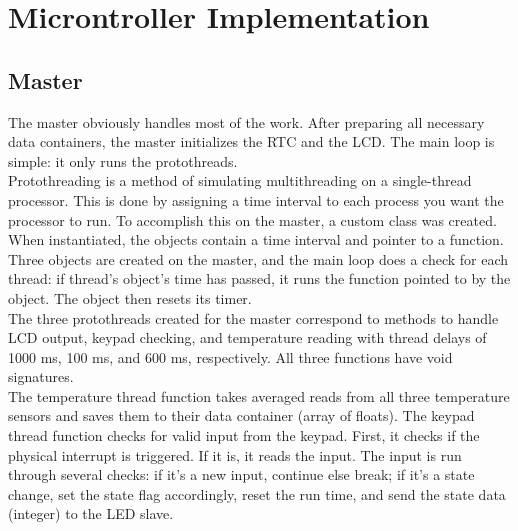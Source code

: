 \documentclass{article}
\begin{document}
\newpage

\section{Microntroller Implementation}
\label{sec:MCUImplementation}


\subsection{Master}
\label{sec:Master}

The master obviously handles most of the work. After preparing all necessary data containers, the master initializes the RTC and the LCD. The main loop is simple: it only runs the protothreads.\\

\noindent Protothreading is a method of simulating multithreading on a single-thread processor. This is done by assigning a time interval to each process you want the processor to run. To accomplish this on the master, a custom class was created. When instantiated, the objects contain a time interval and pointer to a function. Three objects are created on the master, and the main loop does a check for each thread: if thread's object's time has passed, it runs the function pointed to by the object. The object then resets its timer.\\

\noindent The three protothreads created for the master correspond to methods to handle LCD output, keypad checking, and temperature reading with thread delays of 1000 ms, 100 ms, and 600 ms, respectively. All three functions have void signatures.\\

\noindent The temperature thread function takes averaged reads from all three temperature sensors and saves them to their data container (array of floats). The keypad thread function checks for valid input from the keypad. First, it checks if the physical interrupt is triggered. If it is, it reads the input. The input is run through several checks: if it's a new input, continue else break; if it's a state change, set the state flag accordingly, reset the run time, and send the state data (integer) to the LED slave.\\
\end{document}
